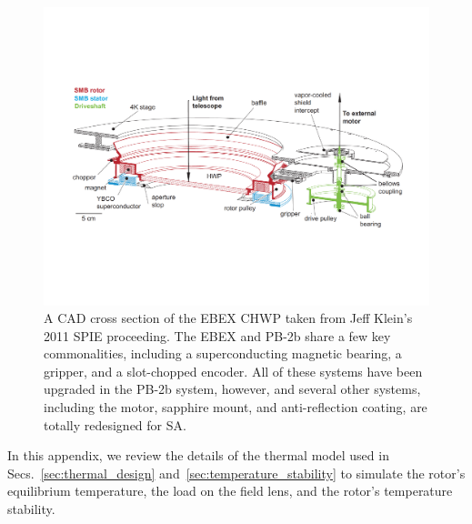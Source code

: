 \begin{figure}
    \centering
    \includegraphics[width=\linewidth, trim=2cm 5cm 1.8cm 5cm, clip]{CHWPDesign/Figures/EBEX_CHWP.pdf}
    \caption{A CAD cross section of the EBEX CHWP taken from Jeff Klein's 2011 SPIE proceeding. The EBEX and PB-2b share a few key commonalities, including a superconducting magnetic bearing, a gripper, and a slot-chopped encoder. All of these systems have been upgraded in the PB-2b system, however, and several other systems, including the motor, sapphire mount, and anti-reflection coating, are totally redesigned for SA.}
    \label{fig:ebex_chwp}
\end{figure}

In this appendix, we review the details of the thermal model used in Secs.~\ref{sec:thermal_design} and~\ref{sec:temperature_stability} to simulate the rotor's equilibrium temperature, the load on the field lens, and the rotor's temperature stability.